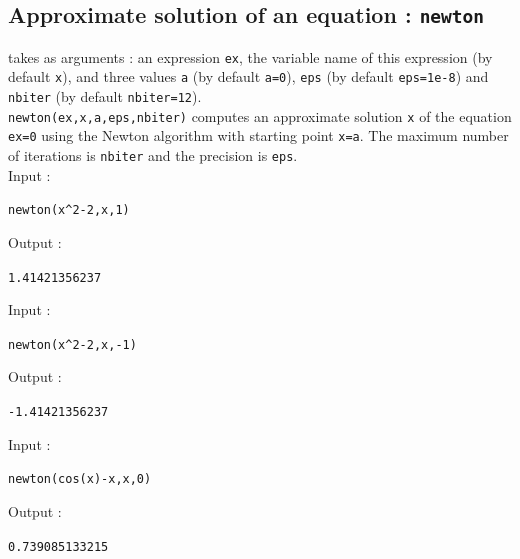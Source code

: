 \documentclass[a4paper,11pt]{book}
\begin{document}
\subsection{Approximate solution of an equation : {\tt newton}}
 takes as arguments : an expression {\tt ex}, 
the variable
name of this expression (by default {\tt x}), and three values {\tt a} (by 
default {\tt a=0}), {\tt eps} (by default {\tt eps=1e-8}) and {\tt nbiter} 
(by default {\tt nbiter=12}).\\
{\tt newton(ex,x,a,eps,nbiter)} computes an approximate 
solution {\tt x} of the equation {\tt ex=0}
using the Newton algorithm with starting point 
{\tt x=a}. The maximum number of iterations is {\tt nbiter}
and the precision is {\tt eps}.\\
Input :
\begin{center}{\tt newton(x\verb|^|2-2,x,1) }\end{center}
Output :
\begin{center}{\tt 1.41421356237}\end{center}
Input :
\begin{center}{\tt newton(x\verb|^|2-2,x,-1) }\end{center}
Output :
\begin{center}{\tt -1.41421356237}\end{center}
Input :
\begin{center}{\tt newton(cos(x)-x,x,0)}\end{center}
Output :
\begin{center}{\tt0.739085133215 }\end{center}
\end{document}
